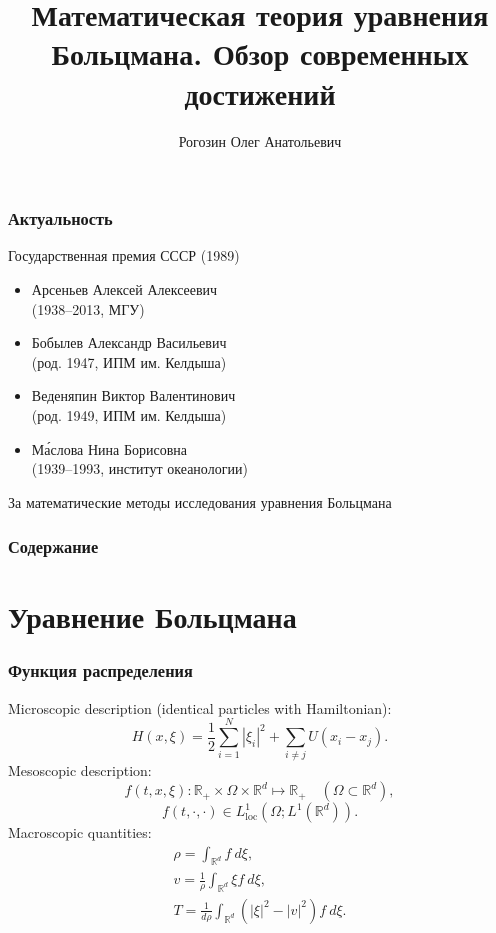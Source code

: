 \documentclass[mathserif]{beamer} %
\title{Математическая теория уравнения Больцмана. Обзор современных достижений}
\author{Рогозин Олег Анатольевич}
\institute{
    Вычислительный центр ФИЦ ИУ РАН
}
\date{}
\newcommand{\loc}{\mathrm{loc}}
\newcommand{\dd}{\:d}%
\newcommand{\dxi}{\dd\xi}
\begin{document}
\frame{\titlepage}

\begin{frame}
    \frametitle{Актуальность}
    \begin{block}{Государственная премия СССР (1989)}
        \begin{itemize}
            \item Арсеньев Алексей Алексеевич\\ (1938--2013, МГУ)
            \item Бобылев Александр Васильевич\\ (род. 1947, ИПМ им. Келдыша)
            \item Веденяпин Виктор Валентинович\\ (род. 1949, ИПМ им. Келдыша)
            \item М\'{а}слова Нина Борисовна\\ (1939--1993, институт океанологии)
        \end{itemize}
        За математические методы исследования уравнения Больцмана
    \end{block}
\end{frame}

\begin{frame}
    \frametitle{Содержание}
    \linespread{0.8}
    \tableofcontents
\end{frame}

\section{Уравнение Больцмана}

\begin{frame}
    \frametitle{Функция распределения}
    Microscopic description (identical particles with Hamiltonian):
    \begin{equation*}
        H(x,\xi) = \frac12 \sum_{i=1}^{N}|\xi_i|^2 + \sum_{i\ne j} U(x_i - x_j).
    \end{equation*}
    Mesoscopic description: %
    \begin{equation*}
        f(t,x,\xi): \mathbb{R}_+\times\Omega\times\mathbb{R}^d\mapsto\mathbb{R}_+
        \quad (\Omega\subset\mathbb{R}^d),
    \end{equation*}
    \begin{equation*}
        f(t,\cdot,\cdot) \in L^1_\loc(\Omega; L^1(\mathbb{R}^d)).
    \end{equation*}
    Macroscopic quantities: %
    \begin{gather*}
        \rho = \int_{\mathbb{R}^d} f\dxi, \\
        v = \frac1\rho\int_{\mathbb{R}^d} \xi f\dxi, \\
        T = \frac1{d\rho}\int_{\mathbb{R}^d} \left(|\xi|^2 - |v|^2\right) f\dxi.
    \end{gather*}
\end{frame}
\end{document}
